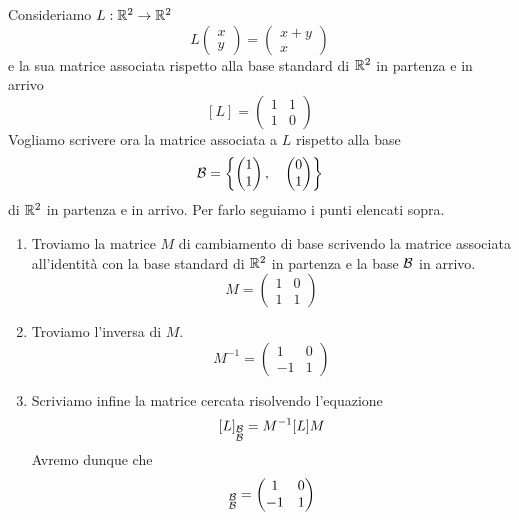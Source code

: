 \begin{example}
	Consideriamo $L : \mathbb{R}^2 \to \mathbb{R}^2$
	\[
		L \begin{pmatrix}
			x \\ y
		\end{pmatrix} =
		\begin{pmatrix}
			x + y \\ x
		\end{pmatrix}
	\]
	e la sua matrice associata rispetto alla base standard di $\mathbb{R}^2$ in
	partenza e in arrivo
	\[
		[L] = \begin{pmatrix}
			1 & 1 \\
			1 & 0
		\end{pmatrix}
	\]
	Vogliamo scrivere ora la matrice associata a $L$ rispetto alla base
	\[
		\mathcal{B} = \left\{
		\begin{pmatrix}
			1 \\ 1
		\end{pmatrix}, \quad
		\begin{pmatrix}
			0 \\ 1
		\end{pmatrix}
		\right\}
	\]
	di $\mathbb{R}^2$ in partenza e in arrivo. Per farlo seguiamo i punti elencati
	sopra.
	\begin{enumerate}
		\item Troviamo la matrice $M$ di cambiamento di base scrivendo la matrice
		      associata all'identità con la base standard di $\mathbb{R}^2$ in partenza
		      e la base $\mathcal{B}$ in arrivo.
		      \[
			      M = \begin{pmatrix}
				      1 & 0 \\
				      1 & 1
			      \end{pmatrix}
		      \]
		\item Troviamo l'inversa di $M$.
		      \[
			      M^{-1} = \begin{pmatrix}
				      1  & 0 \\
				      -1 & 1
			      \end{pmatrix}
		      \]
		\item Scriviamo infine la matrice cercata risolvendo l'equazione
		      \[
			      [L]_{\substack{\mathcal{B} \\ \mathcal{B}}} =
			      M^{-1} [L] M
		      \]
		      Avremo dunque che
		      \begin{gather*}
			      [L]_{\substack{\B \\ \B}} =
			      \begin{pmatrix}
				      1  & 0 \\
				      -1 & 1
			      \end{pmatrix}

\end{gather*}
\end{enumerate}
\end{example}
